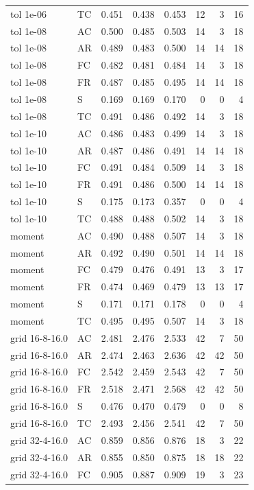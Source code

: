 \begin{longtable}{llrrrrrr}
tol 1e-06 & TC & 0.451 & 0.438 & 0.453 & 12 & 3 & 16\\
tol 1e-08 & AC & 0.500 & 0.485 & 0.503 & 14 & 3 & 18\\
tol 1e-08 & AR & 0.489 & 0.483 & 0.500 & 14 & 14 & 18\\
tol 1e-08 & FC & 0.482 & 0.481 & 0.484 & 14 & 3 & 18\\
tol 1e-08 & FR & 0.487 & 0.485 & 0.495 & 14 & 14 & 18\\
tol 1e-08 & S & 0.169 & 0.169 & 0.170 & 0 & 0 & 4\\
tol 1e-08 & TC & 0.491 & 0.486 & 0.492 & 14 & 3 & 18\\
tol 1e-10 & AC & 0.486 & 0.483 & 0.499 & 14 & 3 & 18\\
tol 1e-10 & AR & 0.487 & 0.486 & 0.491 & 14 & 14 & 18\\
tol 1e-10 & FC & 0.491 & 0.484 & 0.509 & 14 & 3 & 18\\
tol 1e-10 & FR & 0.491 & 0.486 & 0.500 & 14 & 14 & 18\\
tol 1e-10 & S & 0.175 & 0.173 & 0.357 & 0 & 0 & 4\\
tol 1e-10 & TC & 0.488 & 0.488 & 0.502 & 14 & 3 & 18\\
moment & AC & 0.490 & 0.488 & 0.507 & 14 & 3 & 18\\
moment & AR & 0.492 & 0.490 & 0.501 & 14 & 14 & 18\\
moment & FC & 0.479 & 0.476 & 0.491 & 13 & 3 & 17\\
moment & FR & 0.474 & 0.469 & 0.479 & 13 & 13 & 17\\
moment & S & 0.171 & 0.171 & 0.178 & 0 & 0 & 4\\
moment & TC & 0.495 & 0.495 & 0.507 & 14 & 3 & 18\\
grid 16-8-16.0 & AC & 2.481 & 2.476 & 2.533 & 42 & 7 & 50\\
grid 16-8-16.0 & AR & 2.474 & 2.463 & 2.636 & 42 & 42 & 50\\
grid 16-8-16.0 & FC & 2.542 & 2.459 & 2.543 & 42 & 7 & 50\\
grid 16-8-16.0 & FR & 2.518 & 2.471 & 2.568 & 42 & 42 & 50\\
grid 16-8-16.0 & S & 0.476 & 0.470 & 0.479 & 0 & 0 & 8\\
grid 16-8-16.0 & TC & 2.493 & 2.456 & 2.541 & 42 & 7 & 50\\
grid 32-4-16.0 & AC & 0.859 & 0.856 & 0.876 & 18 & 3 & 22\\
grid 32-4-16.0 & AR & 0.855 & 0.850 & 0.875 & 18 & 18 & 22\\
grid 32-4-16.0 & FC & 0.905 & 0.887 & 0.909 & 19 & 3 & 23\\

\end{longtable}
